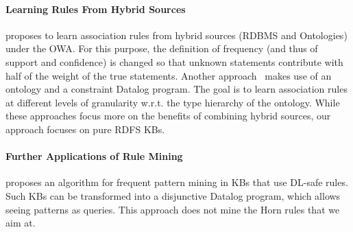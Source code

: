 \paragraph{Learning Rules From Hybrid Sources} %
\cite{DBLP:conf/semweb/dAmatoBS12} proposes to learn association rules from hybrid sources (RDBMS and Ontologies) under the OWA. For this purpose, the definition of frequency (and thus of support and confidence) is changed so that unknown statements contribute with half of the weight of the true statements. 
Another approach~\cite{DBLP:journals/tplp/Lisi08} makes use of an ontology and a constraint Datalog program. The goal is to learn association rules at different levels of granularity w.r.t. the type hierarchy of the ontology.
While these approaches focus more on the benefits of combining hybrid sources, our approach focuses on pure RDFS KBs.


\paragraph{Further Applications of Rule Mining}
\cite{JozLawLuk10} proposes an algorithm for frequent pattern mining in KBs that use DL-safe rules. 
Such KBs can be transformed into a disjunctive Datalog program, which allows seeing patterns as queries. 
This approach does not mine the Horn rules that we aim at.

